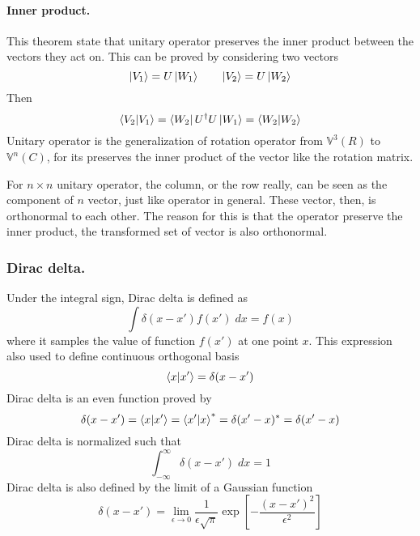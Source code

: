 \documentclass[../main.tex]{subfiles}
\begin{document}
\paragraph*{Inner product.} This theorem state that unitary operator preserves the inner product between the vectors they act on.
This can be proved by considering two vectors
\begin{equation*}
	\ket{V_1}=U \ket{W_1}\qquad \ket{V_2}=U \ket{W_2}
\end{equation*}
Then
\begin{equation*}
	\braket{V_2|V_1}=\bra{W_2}U ^\dagger U \ket{W_1}=\braket{W_2|W_2}
\end{equation*}
Unitary operator is the generalization of rotation operator from $\mathbb{V}^3(R)$ to $\mathbb{V}^n(C)$, for its preserves the inner product of the vector like the rotation matrix.

For $n\times n$ unitary operator, the column, or the row really, can be seen as the component of $n$ vector, just like operator in general.
These vector, then, is orthonormal to each other.
The reason for this is that the operator preserve the inner product, the transformed set of vector is also orthonormal.

\subsubsection*{Dirac delta.}
Under the integral sign, Dirac delta is defined as 
\begin{equation*}
	\int \delta(x-x')f(x')\;dx=f(x)
\end{equation*}
where it samples the value of function $f(x')$ at one point $x$.
This expression also used to define continuous orthogonal basis
\begin{equation*}
	\braket{x|x'}=\delta(x-x')
\end{equation*}
Dirac delta is an even function proved by 
\begin{equation*}
	\delta(x-x')=\braket{x|x'}=\braket{x'|x}^*=\delta(x'-x)^*=\delta(x'-x)
\end{equation*}
Dirac delta is normalized such that 
\begin{equation*}
	\int_{-\infty}^{\infty}\delta(x-x')\;dx=1
\end{equation*}
Dirac delta is also defined by the limit of a Gaussian function
\begin{equation*}
	\delta (x-x')=\lim_{\epsilon \rightarrow 0}\frac{1}{\epsilon \sqrt{\pi}}\exp\left[-\frac{(x-x')^2 }{\epsilon^2}\right]
\end{equation*}
\end{document}
